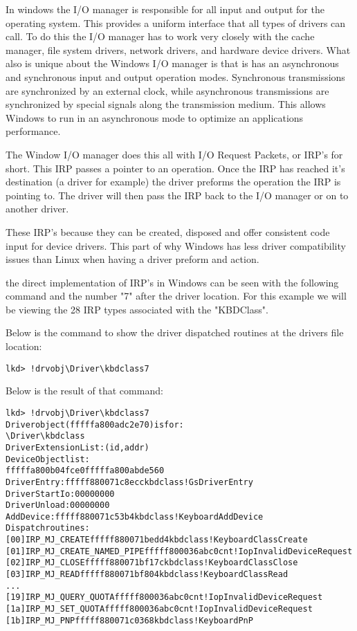 \documentclass[letterpaper,10pt,draftclsnofoot,onecolumn]{IEEEtran}
\begin{document}
In windows the I/O manager is responsible for all input and output for the operating system. This provides a uniform interface that all types of drivers can call. To do this the I/O manager has to work very closely with the cache manager, file system drivers, network drivers, and hardware device drivers. 
What also is unique about the Windows I/O manager is that is has an asynchronous and synchronous input and output operation modes. Synchronous transmissions are synchronized by an external clock, while asynchronous transmissions are synchronized by special signals along the transmission medium. This allows Windows to run in an asynchronous mode to optimize an applications performance.

The Window I/O manager does this all with I/O Request Packets, or IRP's for short. This IRP passes a pointer to an operation. Once the IRP has reached it's destination (a driver for example)  the driver preforms the operation the IRP is pointing to. The driver will then pass the IRP back to the I/O manager or on to another driver.

These IRP's because they can be created, disposed and offer consistent code input for device drivers. This part of why Windows has less driver compatibility issues than Linux when having a driver preform and action. 
\cite{Russinovich}

the direct implementation of IRP's in Windows can be seen with the following command and the number "7" after the driver location. For this example we will be viewing the 28 IRP types associated with the "KBDClass".

Below is the command to show the driver dispatched routines at the drivers file location: 
\begin{lstlisting}
lkd> !drvobj\Driver\kbdclass7
\end{lstlisting}



Below is the result of that command: 

\begin{lstlisting}
lkd> !drvobj\Driver\kbdclass7
Driverobject(fffffa800adc2e70)isfor:
\Driver\kbdclass
DriverExtensionList:(id,addr)
DeviceObjectlist:
fffffa800b04fce0fffffa800abde560
DriverEntry:fffff880071c8ecckbdclass!GsDriverEntry
DriverStartIo:00000000
DriverUnload:00000000
AddDevice:fffff880071c53b4kbdclass!KeyboardAddDevice
Dispatchroutines:
[00]IRP_MJ_CREATEfffff880071bedd4kbdclass!KeyboardClassCreate
[01]IRP_MJ_CREATE_NAMED_PIPEfffff800036abc0cnt!IopInvalidDeviceRequest
[02]IRP_MJ_CLOSEfffff880071bf17ckbdclass!KeyboardClassClose
[03]IRP_MJ_READfffff880071bf804kbdclass!KeyboardClassRead
...
[19]IRP_MJ_QUERY_QUOTAfffff800036abc0cnt!IopInvalidDeviceRequest
[1a]IRP_MJ_SET_QUOTAfffff800036abc0cnt!IopInvalidDeviceRequest
[1b]IRP_MJ_PNPfffff880071c0368kbdclass!KeyboardPnP
\end{lstlisting}
\cite{Russinovich}
\end{document}
